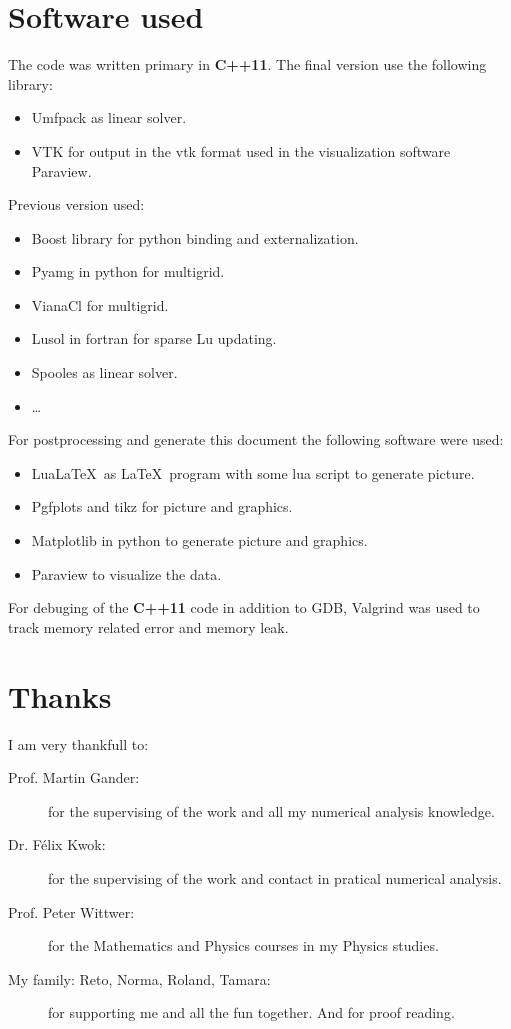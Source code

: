 \section{Software used}

The code was written primary in \textbf{C++11}.
The final version use the following library:
\begin{itemize}
 \item Umfpack as linear solver.
 \item VTK for output in the vtk format used in the visualization software Paraview.
\end{itemize}

Previous version used:
\begin{itemize}
 \item Boost library for python binding and externalization.
 \item Pyamg in python for multigrid.
 \item VianaCl for multigrid.
 \item Lusol in fortran for sparse Lu updating.
 \item Spooles as linear solver.
 \item \ldots
\end{itemize}

For postprocessing and generate this document the following software were used:
\begin{itemize}
 \item Lua\LaTeX \ as \LaTeX \ program with some lua script to generate picture.
 \item Pgfplots and tikz for picture and graphics.
 \item Matplotlib in python to generate picture and graphics.
 \item Paraview to visualize the data.
\end{itemize}

For debuging of the \textbf{C++11} code in addition to GDB, Valgrind was used to track memory
related error and memory leak.

\section{Thanks}

I am very thankfull to:
\begin{description}
 \item[Prof. Martin Gander:] for the supervising of the work and all my numerical analysis knowledge.
 \item[Dr. Félix Kwok:] for the supervising of the work and contact in pratical numerical analysis.
 \item[Prof. Peter Wittwer:] for the Mathematics and Physics courses in my Physics studies.
 \item[My family: Reto, Norma, Roland, Tamara:] for supporting me and all the fun together.
 And for proof reading.
\end{description}

